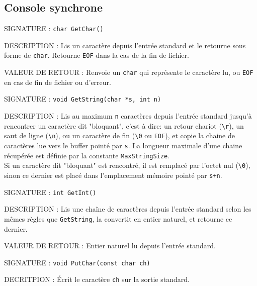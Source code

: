 \documentclass{article}
\begin{document}
	\subsection{Console synchrone}
		\begin{description}
			\item{SIGNATURE : } \texttt{char GetChar()}
			\item{DESCRIPTION :}{ Lis un caractère depuis l'entrée standard et le retourne sous forme de \texttt{char}. Retourne \texttt{EOF} dans la cas de la fin de fichier.}
			\item{VALEUR DE RETOUR : } Renvoie un \texttt{char} qui représente le caractère lu, ou \texttt{EOF} en cas de fin de fichier ou d'erreur.
		\end{description}
		\vspace{2.5mm}
		\begin{description}
			\item{SIGNATURE : } \texttt{void GetString(char *s, int n)}
			\item{DESCRIPTION : } Lis au maximum \texttt{n} caractères depuis l'entrée standard jusqu'à rencontrer un caractère dit "bloquant", c'est à dire: un retour chariot (\texttt{\textbackslash{}r}), un saut de ligne (\texttt{\textbackslash{}n}), ou un caractère de fin (\texttt{\textbackslash{}0} ou \texttt{EOF}), et copie la chaine de caractères lue vers le buffer pointé par \texttt{s}. La longueur maximale d'une chaine récupérée est définie par la constante \texttt{MaxStringSize}. \\Si un caractère dit "bloquant" est rencontré, il est remplacé par l'octet nul (\texttt{\textbackslash{}0}), sinon ce dernier est placé dans l'emplacement mémoire pointé par \texttt{s+n}.
		\end{description}
		\vspace{2.5mm}
		\begin{description}
			\item{SIGNATURE : } \texttt{int GetInt()}
			\item{DESCRIPTION : } Lis une chaîne de caractères depuis l'entrée standard selon les mêmes règles que \texttt{GetString}, la convertit en entier naturel, et retourne ce dernier.
			\item{VALEUR DE RETOUR : } Entier naturel lu depuis l'entrée standard.
		\end{description}
		\vspace{2.5mm}
		\begin{description}
			\item{SIGNATURE : } \texttt{void PutChar(const char ch)}
			\item{DECRITPION : } Écrit le caractère \texttt{ch} sur la sortie standard. 
		\end{description}
\end{document}

